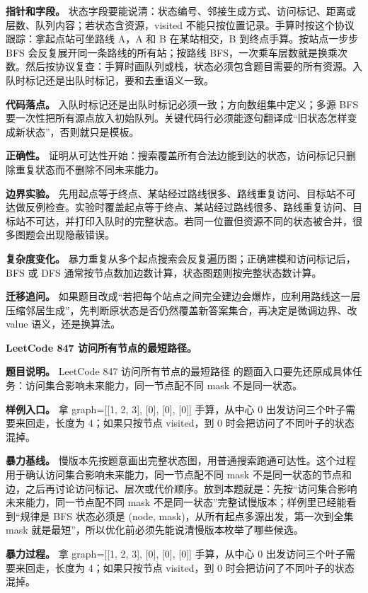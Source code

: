 \textbf{指针和字段。} 状态字段要能说清：状态编号、邻接生成方式、访问标记、距离或层数、队列内容；若状态含资源，visited 不能只按位置记录。手算时按这个协议跟踪：拿起点站可坐路线 A，A 和 B 在某站相交，B 到终点手算。按站点一步步 BFS 会反复展开同一条路线的所有站；按路线 BFS，一次乘车层数就是换乘次数。然后按协议复查：手算时画队列或栈，状态必须包含题目需要的所有资源。入队时标记还是出队时标记，要和去重语义一致。

\textbf{代码落点。} 入队时标记还是出队时标记必须一致；方向数组集中定义；多源 BFS 要一次性把所有源点放入初始队列。关键代码行必须能逐句翻译成“旧状态怎样变成新状态”，否则就只是模板。

\textbf{正确性。} 证明从可达性开始：搜索覆盖所有合法边能到达的状态，访问标记只删除重复状态而不删除不同未来能力。

\textbf{边界实验。} 先用起点等于终点、某站经过路线很多、路线重复访问、目标站不可达做反例检查。实验时覆盖起点等于终点、某站经过路线很多、路线重复访问、目标站不可达，并打印入队时的完整状态。若同一位置但资源不同的状态被合并，很多图题会出现隐蔽错误。

\textbf{复杂度变化。} 暴力重复从多个起点搜索会反复遍历图；正确建模和访问标记后，BFS 或 DFS 通常按节点数加边数计算，状态图题则按完整状态数计算。

\textbf{迁移追问。} 如果题目改成“若把每个站点之间完全建边会爆炸，应利用路线这一层压缩邻居生成”，先判断原状态是否仍然覆盖新答案集合，再决定是微调边界、改 value 语义，还是换算法。

\noindent\textbf{LeetCode 847 访问所有节点的最短路径。}

\textbf{题目说明。} LeetCode 847 访问所有节点的最短路径 的题面入口要先还原成具体任务：访问集合影响未来能力，同一节点配不同 mask 不是同一状态。

\textbf{样例入口。} 拿 graph=[[1, 2, 3], [0], [0], [0]] 手算，从中心 0 出发访问三个叶子需要来回走，长度为 4；如果只按节点 visited，到 0 时会把访问了不同叶子的状态混掉。

\textbf{暴力基线。} 慢版本先按题意画出完整状态图，用普通搜索跑通可达性。这个过程用于确认访问集合影响未来能力，同一节点配不同 mask 不是同一状态的节点和边，之后再讨论访问标记、层次或代价顺序。放到本题就是：先按“访问集合影响未来能力，同一节点配不同 mask 不是同一状态”完整试慢版本；样例里已经能看到“规律是 BFS 状态必须是 (node, mask)，从所有起点多源出发，第一次到全集 mask 就是最短”，所以优化前必须先能说清慢版本枚举了哪些候选。

\textbf{暴力过程。} 拿 graph=[[1, 2, 3], [0], [0], [0]] 手算，从中心 0 出发访问三个叶子需要来回走，长度为 4；如果只按节点 visited，到 0 时会把访问了不同叶子的状态混掉。

